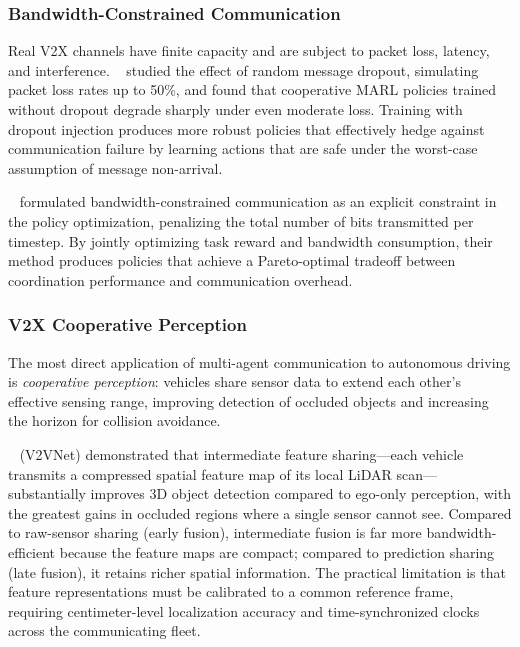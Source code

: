 \documentclass[12pt, a4paper]{article}
\begin{document}
\subsubsection{Bandwidth-Constrained Communication}

Real V2X channels have finite capacity and are subject to packet loss, latency,
and interference.  \citeauthor{kim2019message}~\cite{kim2019message} studied
the effect of random message dropout, simulating packet loss rates up to 50\%,
and found that cooperative MARL policies trained without dropout degrade sharply
under even moderate loss.  Training with dropout injection produces more robust
policies that effectively hedge against communication failure by learning actions
that are safe under the worst-case assumption of message non-arrival.

\citeauthor{wang2020bandwidth}~\cite{wang2020bandwidth} formulated
bandwidth-constrained communication as an explicit constraint in the policy
optimization, penalizing the total number of bits transmitted per timestep.
By jointly optimizing task reward and bandwidth consumption, their method
produces policies that achieve a Pareto-optimal tradeoff between coordination
performance and communication overhead.

\subsubsection{V2X Cooperative Perception}

The most direct application of multi-agent communication to autonomous driving
is \emph{cooperative perception}: vehicles share sensor data to extend each
other's effective sensing range, improving detection of occluded objects and
increasing the horizon for collision avoidance.

\citeauthor{wang2020v2vnet}~\cite{wang2020v2vnet} (V2VNet) demonstrated that
intermediate feature sharing---each vehicle transmits a compressed spatial
feature map of its local LiDAR scan---substantially improves 3D object detection
compared to ego-only perception, with the greatest gains in occluded regions
where a single sensor cannot see.  Compared to raw-sensor sharing (early fusion),
intermediate fusion is far more bandwidth-efficient because the feature maps
are compact; compared to prediction sharing (late fusion), it retains richer
spatial information.  The practical limitation is that feature representations
must be calibrated to a common reference frame, requiring centimeter-level
localization accuracy and time-synchronized clocks across the communicating
fleet.
\end{document}
